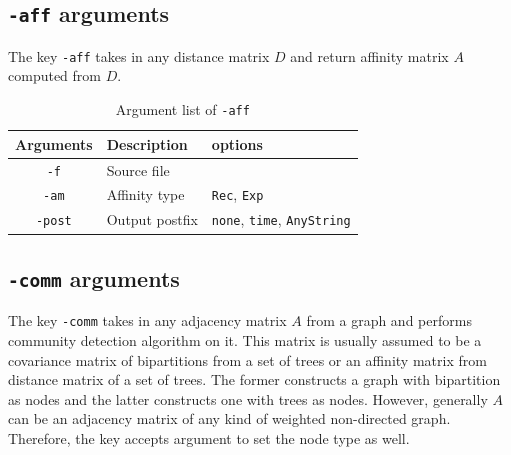 \documentclass[11pt,a4paper]{article}
\theoremstyle{definition}
\theoremstyle{definition}
\numberwithin{equation}{section}
\begin{document}
	\clearpage
	
	\subsection{\texttt{-aff} arguments}
	
	The key \texttt{-aff} takes in any distance matrix $D$ and return affinity matrix $A$ computed from $D$.
	
	
	\begin{table}[!h]
		\centering
		\begin{tabular}{cll}
			\hline
			Arguments & Description & options\\
			\hline
			\texttt{-f}& Source file &  \\
			\hline
			\texttt{-am}& Affinity type & \texttt{Rec}, \texttt{Exp}\\
			\hline
			\texttt{-post} & Output postfix&\texttt{none}, \texttt{time}, \texttt{AnyString}\\
			\hline
		\end{tabular}
		\caption{Argument list of \texttt{-aff}}
		\label{tab:aff}
	\end{table}
	
	\subsection{\texttt{-comm} arguments}
	
	The key \texttt{-comm} takes in any adjacency matrix $A$ from a graph and performs community detection algorithm on it. This matrix is usually assumed to be a covariance matrix of bipartitions from a set of trees or an affinity matrix from distance matrix of a set of trees. The former constructs a graph with bipartition as nodes and the latter constructs one with trees as nodes. However, generally $A$ can be an adjacency matrix of any kind of weighted non-directed graph. Therefore, the key accepts argument to set the node type as well.
	
\end{document}
